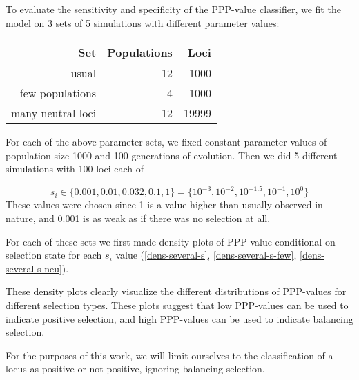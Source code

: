 \documentclass[a4paper,12pt]{article}
\begin{document}
To evaluate the sensitivity and specificity of the PPP-value
classifier, we fit the model on 3 sets of 5 simulations with different
parameter values:

\begin{center}
\begin{tabular}{rrr}
  Set & Populations & Loci \\
  \hline
  usual & 12 & 1000 \\ %
  few populations & 4 & 1000\\   %
  many neutral loci & 12 & 19999   %
\end{tabular}
\end{center}

For each of the above parameter sets, we fixed constant parameter
values of population size 1000 and 100 generations of evolution. Then
we did 5 different simulations with 100 loci each of

$$
s_i\in\{0.001,0.01,0.032,0.1,1\}=\{10^{-3},10^{-2},10^{-1.5},10^{-1},10^0\}
$$
These values were chosen since 1 is a value higher than usually
observed in nature, and 0.001 is as weak as if there was no selection
at all.

For each of these sets we first made density plots of PPP-value
conditional on selection state for each $s_i$ value
(\autoref{dens-several-s}, \autoref{dens-several-s-few},
\autoref{dens-several-s-neu}).




These density plots clearly visualize the different distributions of
PPP-values for different selection types. These plots suggest that low
PPP-values can be used to indicate positive selection, and high
PPP-values can be used to indicate balancing selection.

For the purposes of this work, we will limit ourselves to the
classification of a locus as positive or not positive, ignoring
balancing selection.
\end{document}
